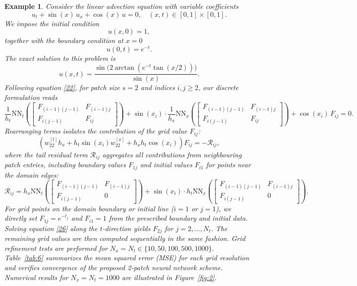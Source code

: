 \documentclass[pdflatex,sn-mathphys-num]{sn-jnl}%
\theoremstyle{thmstyleone}%
\theoremstyle{thmstyletwo}%
\newtheorem{example}{Example}%
\theoremstyle{thmstylethree}%
\begin{document}
{\begin{example}\cite{Chen2021}
Consider the linear advection equation with variable coefficients
\begin{equation}
u_t +  \sin(x)\,u_x + \cos(x)\,u = 0,\quad (x,t)\in[0,1]\times [0,1].
\end{equation}
We impose the initial condition
\[
u(x,0)=1,
\]
together with the boundary condition at $x=0$
\[
u(0,t)=e^{-t}.
\]
The exact solution to this problem is
\[
u(x,t)=\frac{\sin\big(2\arctan\left(e^{-t}\tan(x/2)\right)\big)}{\sin(x)}.
\]
Following equation \eqref{22}, for patch size $s=2$ and indices $i,j\geq 2$, our discrete formulation reads
\[
\frac{1}{h_t}\mathrm{NN}_t\left(
\begin{bmatrix}
F_{(i-1)(j-1)} & F_{(i-1)j}\\
F_{i(j-1)} & F_{ij}
\end{bmatrix}
\right)
+
\sin(x_i)\cdot \frac{1}{h_x}\mathrm{NN}_x\left(
\begin{bmatrix}
F_{(i-1)(j-1)} & F_{(i-1)j}\\
F_{i(j-1)} & F_{ij}
\end{bmatrix}
\right)
+
\cos(x_i)\,F_{ij}
=0.
\]
Rearranging terms isolates the contribution of the grid value $F_{ij}$:
\begin{equation}\label{26}
\left(w_{22}^{[t]}h_x+h_t\sin(x_i){w_{22}^{[x]}}+h_xh_t\cos(x_i)\right)F_{ij}=-\mathcal{R}_{ij},
\end{equation}
where the tail residual term $\mathcal{R}_{ij}$ aggregates all contributions from neighbouring patch entries, including boundary values $F_{1j}$ and initial values $F_{i1}$ for points near the domain edges:
\[
\mathcal{R}_{ij} = h_x\mathrm{NN}_t\left(
\begin{bmatrix}
F_{(i-1)(j-1)} & F_{(i-1)j}\\
F_{i(j-1)} & 0
\end{bmatrix}
\right)
+
\sin(x_i)\cdot h_t\mathrm{NN}_x\left(
\begin{bmatrix}
F_{(i-1)(j-1)} & F_{(i-1)j}\\
F_{i(j-1)} & 0
\end{bmatrix}
\right).
\]
For grid points on the domain boundary or initial line ($i=1$ or $j=1$), we directly set $F_{1j}=e^{-t_j}$ and $F_{i1}=1$ from the prescribed boundary and initial data. Solving equation \eqref{26} along the $t$-direction yields $F_{2j}$ for $j=2,\ldots,N_t$. The remaining grid values are then computed sequentially in the same fashion. Grid refinement tests are performed for $N_x=N_t \in \{10,50,100,500,1000\}$.
Table~\ref{tab:6} summarizes the mean squared error (MSE) for each grid resolution and verifies convergence of the proposed 2-patch neural network scheme. Numerical results for $N_x=N_t=1000$ are illustrated in Figure~\ref{fig:2}.



\end{example}}
\end{document}
